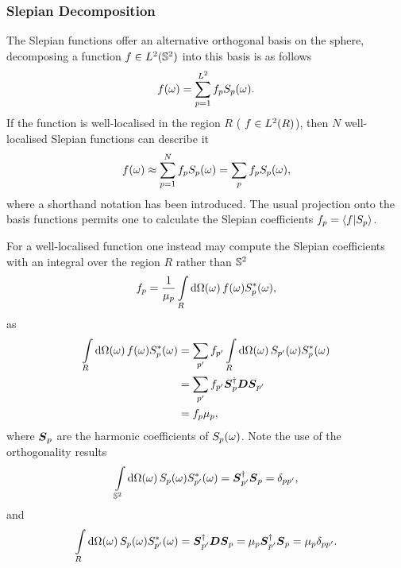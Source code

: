 \subsubsection{Slepian Decomposition}

The Slepian functions offer an alternative orthogonal basis on the sphere, decomposing a function \(f \in \hilbert{\twoSphere}\) into this basis is as follows
%
\begin{equation}
	\pixel{f}
	= \sum\limits_{p=1}^{L^{2}} \slepian{f}\pixel{\slepian{S}}.
\end{equation}
%
If the function is well-localised in the region \(R\) (\ie{} \(f \in \hilbert{R}\)), then \(N\) well-localised Slepian functions can describe it
%
\begin{equation}\label{eq:chapter3_slepian_inverse}
	\pixel{f}
	\approx \sum\limits_{p=1}^{N} \slepian{f}\pixel{\slepian{S}} \\
	= \slepianSum \slepian{f}\pixel{\slepian{S}},
\end{equation}
%
where a shorthand notation has been introduced.
The usual projection onto the basis functions permits one to calculate the Slepian coefficients \(\slepian{f} = \braket{f}{\slepian{S}}\).

For a well-localised function one instead may compute the Slepian coefficients with an integral over the region \(R\) rather than \(\twoSphere{}\)
%
\begin{equation}
	\slepian{f}
	= \frac{1}{\slepian{\mu}} \integrateRegion{\omega} \pixel{f} \pixel{\conj{\slepian{S}}},
\end{equation}
%
as
%
\begin{align}
	\integrateRegion{\omega} \pixel{f} \pixel{\conj{\slepian{S}}}
	 & = \slepianSum['] \slepian[']{f} \integrateRegion{\omega} \pixel{\slepian[']{S}} \pixel{\conj{\slepian{S}}} \nonumber \\
	 & = \slepianSum['] \slepian[']{f} \slepian{\vb*{S}}^{\dagger} \vb*{D} \slepian[']{\vb*{S}} \nonumber                   \\
	 & = \slepian{f} \slepian{\mu},
\end{align}
%
where \(\slepian{\vb*{S}}\) are the harmonic coefficients of \(\pixel{\slepian{S}}\).
Note the use of the orthogonality results
%
\begin{equation}\label{eq:chapter3_orthogonality_sphere}
	\integrateSphere{\omega} \pixel{\slepian{S}} \pixel{\conj{\slepian[']{S}}}
	= \slepian[']{\vb*{S}}^{\dagger} \slepian{\vb*{S}}
	= \delta_{pp'},
\end{equation}
%
and
%
\begin{equation}
	\integrateRegion{\omega} \pixel{\slepian{S}} \pixel{\conj{\slepian[']{S}}}
	= \slepian[']{\vb*{S}}^{\dagger} \vb*{D} \slepian{\vb*{S}}
	= \slepian{\mu} \slepian[']{\vb*{S}}^{\dagger} \slepian{\vb*{S}}
	= \slepian{\mu} \delta_{pp'}.
\end{equation}

